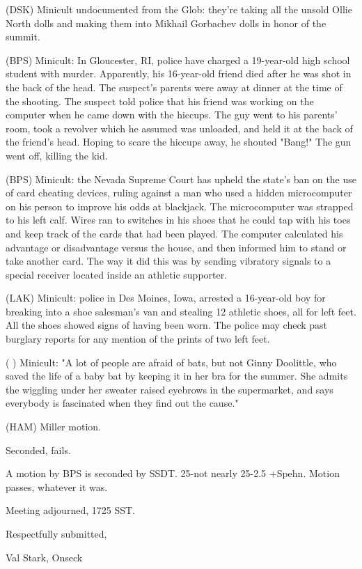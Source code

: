 \documentclass[12pt]{article}
\begin{document}
(DSK) Minicult undocumented from the Glob: they're taking all the unsold Ollie North dolls and making them into Mikhail Gorbachev dolls in honor of the summit.

(BPS) Minicult: In Gloucester, RI, police have charged a 19-year-old high school student with murder. Apparently, his 16-year-old friend died after he was shot in the back of the head. The suspect's parents were away at dinner at the time of the shooting. The suspect told police that his friend was working on the computer when he came down with the hiccups. The guy went to his parents' room, took a revolver which he assumed was unloaded, and held it at the back of the friend's head. Hoping to scare the hiccups away, he shouted "Bang!" The gun went off, killing the kid.

(BPS) Minicult: the Nevada Supreme Court has upheld the state's ban on the use of card cheating devices, ruling against a man who used a hidden microcomputer on his person to improve his odds at blackjack. The microcomputer was strapped to his left calf. Wires ran to switches in his shoes that he could tap with his toes and keep track of the cards that had been played. The computer calculated his advantage or disadvantage versus the house, and then informed him to stand or take another card. The way it did this was by sending vibratory signals to a special receiver located inside an athletic supporter.

(LAK) Minicult: police in Des Moines, Iowa, arrested a 16-year-old boy for breaking into a shoe salesman's van and stealing 12 athletic shoes, all for left feet. All the shoes showed signs of having been worn. The police may check past burglary reports for any mention of the prints of two left feet.

( ) Minicult: "A lot of people are afraid of bats, but not Ginny Doolittle, who saved the life of a baby bat by keeping it in her bra for the summer. She admits the wiggling under her sweater raised eyebrows in the supermarket, and says everybody is fascinated when they find out the cause."

(HAM) Miller motion.

Seconded, fails.

A motion by BPS is seconded by SSDT. 25-not nearly 25-2.5 +Spehn. Motion passes, whatever it was.

\vspace{12pt}

\noindent
Meeting adjourned, 1725 SST.

\vspace{18pt}

\centerline{Respectfully submitted,}
\centerline{Val Stark, Onseck}
\end{document}
